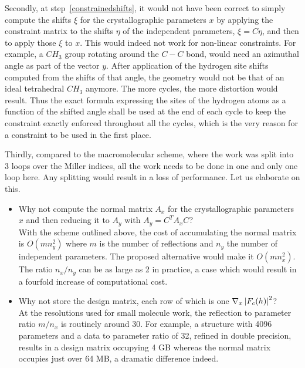 \documentclass[12pt]{article}
\begin{document}
Secondly, at step~\ref{constrainedshifts}, it would not have been correct to simply compute the shifts $\xi$ for the crystallographic parameters $x$ by applying the constraint matrix to the shifts $\eta$ of the independent parameters, $\xi = C \eta$, and then to apply those $\xi$ to $x$. This would indeed not work for non-linear constraints. For example, a $CH_3$ group rotating around the $C-C$ bond, would need an azimuthal angle as part of the vector $y$. After application of the hydrogen site shifts computed from the shifts of that angle, the geometry would not be that of an ideal tetrahedral $CH_3$ anymore. The more cycles, the more distortion would result. Thus the exact formula expressing the sites of the hydrogen atoms as a function of the shifted angle shall be used at the end of each cycle to keep the constraint exactly enforced throughout all the cycles, which is the very reason for a constraint to be used in the first place.

Thirdly, compared to the macromolecular scheme, where the work was split into 3 loops over the Miller indices, all the work needs to be done in one and only one loop here. Any splitting would result in a loss of performance. Let us elaborate on this.
\begin{itemize}
\item Why not compute the normal matrix $A_x$ for the crystallographic parameters $x$ and then reducing it to $A_y$ with $A_y = C^T A_x C$?\\
With the scheme outlined above, the cost of accumulating the normal matrix is $O(m n_y^2)$ where $m$ is the number of reflections and $n_y$ the number of independent parameters. The proposed alternative would make it $O(m n_x^2)$. The ratio $n_x/n_y$ can be as large as 2 in practice, a case which would result in a fourfold increase of computational cost.
\item Why not store the design matrix, each row of which is one $\nabla_x \left| F_c(h) \right|^2$?\\
At the resolutions used for small molecule work, the reflection to parameter ratio $m/n_x$ is routinely around 30. For example, a structure with 4096 parameters and a data to parameter ratio of 32, refined in double precision, results in a design matrix occupying 4 GB whereas the normal matrix occupies just over 64 MB, a dramatic difference indeed.
\end{itemize}
\end{document}
